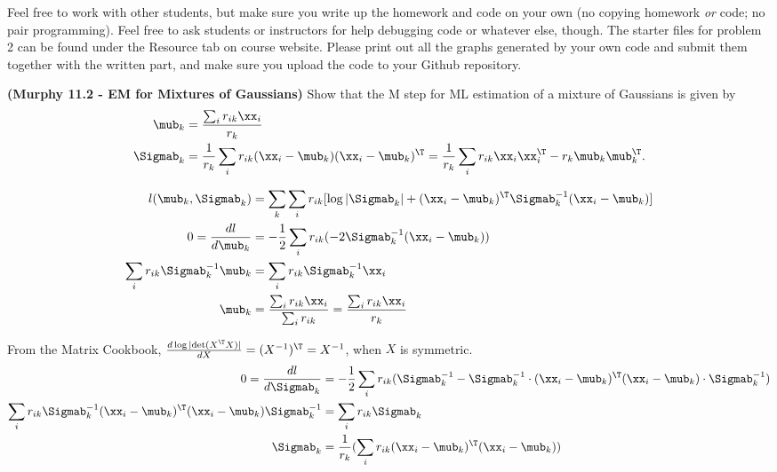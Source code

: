 \documentclass[12pt,letterpaper,fleqn]{hmcpset}
\begin{document}
Feel free to work with other students, but make sure you write up the homework
and code on your own (no copying homework \textit{or} code; no pair programming).
Feel free to ask students or instructors for help debugging code or whatever else,
though.
\newline
\newline
The starter files for problem 2 can be found under the Resource tab on course website. Please print out all the graphs generated by your own code and submit them together with the written part, and make sure you upload the code to your Github repository.\\

\begin{problem}[1]
\textbf{(Murphy 11.2 - EM for Mixtures of Gaussians)} Show that the M step for ML
estimation of a mixture of Gaussians is given by
\begin{align*}
    \mub_k &= \frac{\sum_i r_{ik}\xx_i}{r_k}\\
    \Sigmab_k &= \frac{1}{r_k}\sum_i r_{ik}(\xx_i - \mub_k)(\xx_i - \mub_k)^\T = \frac{1}{r_k}\sum_i r_{ik}\xx_i\xx_i^\T - r_k\mub_k\mub_k^\T.
\end{align*}
\end{problem}
\begin{solution}
    \begin{align*}
        l(\mub_k, \Sigmab_k) &= \sum_k \sum_i r_{ik} [\log |\Sigmab_k| + (\xx_i - \mub_k)^\T \Sigmab_k^{-1} (\xx_i - \mub_k)] \\
        0 = \frac{dl}{d\mub_k} &= -\frac{1}{2} \sum\limits_{i} r_{ik} (-2 \Sigmab_k^{-1} (\xx_i - \mub_k)) \\
        \sum_i r_{ik} \Sigmab_k^{-1} \mub_k &= \sum_i r_{ik} \Sigmab_k^{-1} \xx_i \\
        \mub_k &= \frac{\sum_i r_{ik} \xx_i}{\sum_i r_{ik}} = \frac{\sum_i r_{ik} \xx_i}{r_k}
    \end{align*}

    From the Matrix Cookbook, $\frac{d \log |\text{det}(X^\T X)|}{d X} = (X^{-1})^\T = X^{-1}$, when $X$ is symmetric.
    \begin{align*}
        0 = \frac{dl}{d\Sigmab_k} &= -\frac{1}{2} \sum_i r_{ik} (\Sigmab_k^{-1} - \Sigmab_k^{-1} \cdot (\xx_i-\mub_k)^\T (\xx_i-\mub_k) \cdot \Sigmab_k^{-1}) \\
        \sum_i r_{ik} \Sigmab_k^{-1} (\xx_i - \mub_k)^\T (\xx_i - \mub_k) \Sigmab_k^{-1} &= \sum_i r_{ik} \Sigmab_k \\
        \Sigmab_k &= \frac{1}{r_k}(\sum_i r_{ik} (\xx_i - \mub_k)^\T (\xx_i - \mub_k))
    \end{align*}
\end{solution}
\newpage
\end{document}

